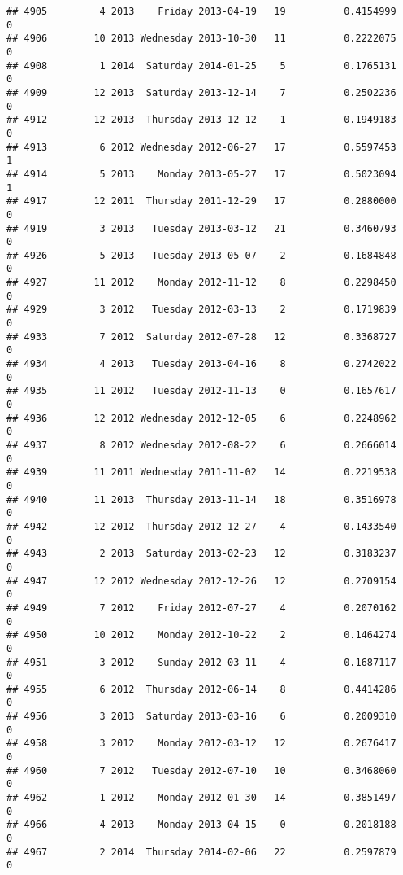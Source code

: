 \documentclass[
]{article}
\begin{document}
\begin{verbatim}
## 4905         4 2013    Friday 2013-04-19   19          0.4154999             0
## 4906        10 2013 Wednesday 2013-10-30   11          0.2222075             0
## 4908         1 2014  Saturday 2014-01-25    5          0.1765131             0
## 4909        12 2013  Saturday 2013-12-14    7          0.2502236             0
## 4912        12 2013  Thursday 2013-12-12    1          0.1949183             0
## 4913         6 2012 Wednesday 2012-06-27   17          0.5597453             1
## 4914         5 2013    Monday 2013-05-27   17          0.5023094             1
## 4917        12 2011  Thursday 2011-12-29   17          0.2880000             0
## 4919         3 2013   Tuesday 2013-03-12   21          0.3460793             0
## 4926         5 2013   Tuesday 2013-05-07    2          0.1684848             0
## 4927        11 2012    Monday 2012-11-12    8          0.2298450             0
## 4929         3 2012   Tuesday 2012-03-13    2          0.1719839             0
## 4933         7 2012  Saturday 2012-07-28   12          0.3368727             0
## 4934         4 2013   Tuesday 2013-04-16    8          0.2742022             0
## 4935        11 2012   Tuesday 2012-11-13    0          0.1657617             0
## 4936        12 2012 Wednesday 2012-12-05    6          0.2248962             0
## 4937         8 2012 Wednesday 2012-08-22    6          0.2666014             0
## 4939        11 2011 Wednesday 2011-11-02   14          0.2219538             0
## 4940        11 2013  Thursday 2013-11-14   18          0.3516978             0
## 4942        12 2012  Thursday 2012-12-27    4          0.1433540             0
## 4943         2 2013  Saturday 2013-02-23   12          0.3183237             0
## 4947        12 2012 Wednesday 2012-12-26   12          0.2709154             0
## 4949         7 2012    Friday 2012-07-27    4          0.2070162             0
## 4950        10 2012    Monday 2012-10-22    2          0.1464274             0
## 4951         3 2012    Sunday 2012-03-11    4          0.1687117             0
## 4955         6 2012  Thursday 2012-06-14    8          0.4414286             0
## 4956         3 2013  Saturday 2013-03-16    6          0.2009310             0
## 4958         3 2012    Monday 2012-03-12   12          0.2676417             0
## 4960         7 2012   Tuesday 2012-07-10   10          0.3468060             0
## 4962         1 2012    Monday 2012-01-30   14          0.3851497             0
## 4966         4 2013    Monday 2013-04-15    0          0.2018188             0
## 4967         2 2014  Thursday 2014-02-06   22          0.2597879             0

\end{verbatim}
\end{document}
